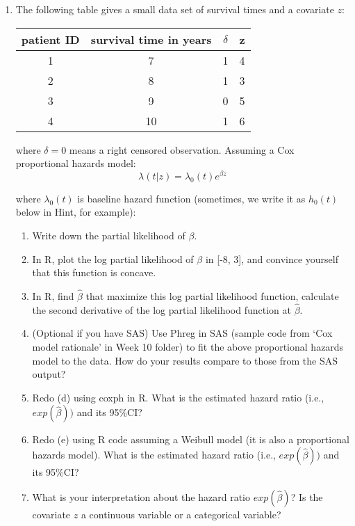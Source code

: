 \begin{enumerate}



\item The following table gives a small data set of survival times and a covariate $z$:

\begin{center}

\begin{tabular}{|c|c|c|c|}
 \hline
\hline
patient ID & survival time in years & $\delta$ &z
\\
\hline
1	& 7 & 1 & 4\\
\hline
2	&8 &  1&3\\
\hline
3	&9 & 0 & 5\\
\hline
4	&10 & 1& 6\\
\hline
\hline

\end{tabular}
\end{center}

where $\delta = 0$ means a right censored observation. Assuming a Cox proportional hazards model:
$$
\lambda(t|z) = \lambda_0(t) e^{\beta z}
$$

where $\lambda_0(t)$ is baseline hazard function (sometimes, we write it as $h_0(t)$ below in Hint, for example):


\begin{enumerate}
\item Write down the partial likelihood of $\beta$.
\item In R, plot the log partial likelihood of $\beta$ in [-8, 3], and convince yourself that this function is concave.
\item In R, find $\hat{\beta}$ that maximize this log partial likelihood function, calculate the second derivative of
the log partial likelihood function at $\hat{\beta}$.
\item (Optional if you have SAS) Use Phreg in SAS (sample code from `Cox model rationale' in Week 10 folder) to fit the above proportional hazards model to the data. How do your results compare to those from the SAS output?
\item Redo (d) using coxph in R. What is the estimated hazard ratio (i.e., $exp(\hat{\beta}))$ and its 95\%CI?
\item Redo (e) using R code assuming a Weibull model (it is also a proportional hazards model). What is the estimated hazard ratio (i.e., $exp(\hat{\beta}))$ and its 95\%CI? 
\item What is your interpretation about the hazard ratio $exp(\hat{\beta})$? Is the covariate $z$ a continuous variable or a categorical variable?

\end{enumerate}



\end{enumerate}

